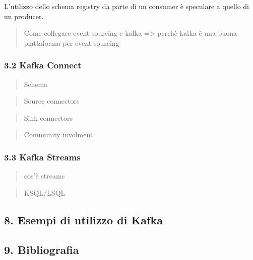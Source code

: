 \documentclass[]{article}
\begin{document}
L'utilizzo dello schema registry da parte di un consumer è speculare a
quello di un producer.

\newpage

\begin{quote}
Come collegare event sourcing e kafka =\textgreater{} perchè kafka è una
buona piattaforma per event sourcing
\end{quote}

\subsubsection{3.2 Kafka Connect}\label{kafka-connect}

\begin{quote}
Schema
\end{quote}

\begin{quote}
Source connectors
\end{quote}

\begin{quote}
Sink connectors
\end{quote}

\begin{quote}
Community involment
\end{quote}

\subsubsection{3.3 Kafka Streams}\label{kafka-streams}

\begin{quote}
cos'è streams
\end{quote}

\begin{quote}
KSQL/LSQL
\end{quote}

\subsection{8. Esempi di utilizzo di
Kafka}\label{esempi-di-utilizzo-di-kafka}

\newpage

\subsection{9. Bibliografia}\label{bibliografia}
\end{document}
